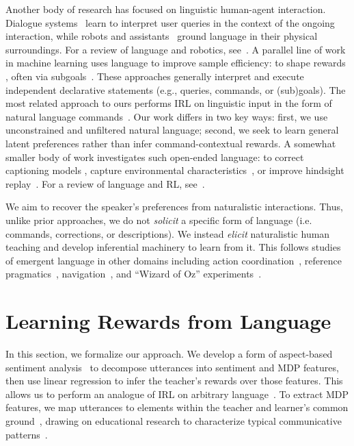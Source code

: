 \documentclass[letterpaper]{article} %
\begin{document}
Another body of research has focused on linguistic human-agent interaction. Dialogue systems~\citep{artzi_2011_bootstrapping, li2016dialogue} learn to interpret user queries in the context of the ongoing interaction, while robots and assistants~\cite{thomason_2015, wang_2019_navigation, thomason_2020, szlam2019build} ground language in their physical surroundings. For a review of language and robotics, see~\citet{Tellex2020}. A parallel line of work in machine learning uses language to improve sample efficiency: to shape rewards \citep{maclin_1994, kuhlman_2004}, often via subgoals~\citep{kaplan_atari, tellex_2018_rewards, chevalier_boisvert_2018, goyal2019using, Bahdanau_2019, zhou2020inverse}. These approaches generally interpret and execute independent declarative statements (e.g., queries, commands, or (sub)goals). The most related approach to ours  performs IRL on linguistic input in the form of natural language commands~\citep{macglashan2015grounding, fu_2019_goals, goyal2020pixl2r}. 
Our work differs in two key ways: first, we use unconstrained and unfiltered natural language; second, we seek to learn general latent preferences rather than infer command-contextual rewards. A somewhat smaller body of work investigates such open-ended language: to correct captioning models \cite{Ling2017_captions}, capture environmental characteristics~\citep{narasimhan2018grounding}, or improve hindsight replay~\citep{cideron2019selfeducated}. For a review of language and RL, see~\citet{luketina2019survey}. 

We aim to recover the speaker's preferences from naturalistic interactions. Thus, unlike prior approaches, we do not \textit{solicit} a specific form of language (i.e. commands, corrections, or descriptions). We instead \textit{elicit} naturalistic human teaching and develop inferential machinery to learn from it. This follows studies of emergent language in other domains including action coordination~\citep{Djalali2011, Djalali_2012, potts_2012, ilinykh2019meetup, Suhr_2019}, reference pragmatics~\citep{He_2017, Udagawa_2019}, navigation~\citep{thomason2019visionanddialog}, and ``Wizard of Oz'' experiments~\citep{kim2009people, fraser2018_natural_language_agent}.

\section{Learning Rewards from Language}
\label{overall_rewards_from_language_section}
In this section, we formalize our approach. We develop a form of aspect-based sentiment analysis~\cite{hu2004mining, liu2020sentiment} to decompose utterances into sentiment and MDP features, then use linear regression to infer the teacher's rewards over those features. This allows us to perform an analogue of IRL on arbitrary language~\cite{abbeel2004apprenticeship}. To extract MDP features, we map utterances to elements within the teacher and learner's common ground~\cite{harnad1990symbol, clark1996using, mooney2008learning}, drawing on educational research to characterize typical communicative patterns~\citep{shute_2008, Lipnevich_education}.
\end{document}
